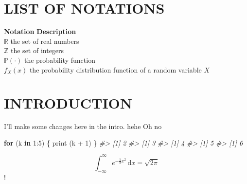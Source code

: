 \documentclass{source/tex/templates/maththesis}
\newenvironment{Shaded}{\begin{snugshade}}{\end{snugshade}}
\newcommand{\CommentTok}[1]{\textcolor[rgb]{0.56,0.35,0.01}{\textit{#1}}}
\newcommand{\ControlFlowTok}[1]{\textcolor[rgb]{0.13,0.29,0.53}{\textbf{#1}}}
\newcommand{\DecValTok}[1]{\textcolor[rgb]{0.00,0.00,0.81}{#1}}
\newcommand{\FunctionTok}[1]{\textcolor[rgb]{0.00,0.00,0.00}{#1}}
\newcommand{\NormalTok}[1]{#1}
\newcommand{\SpecialCharTok}[1]{\textcolor[rgb]{0.00,0.00,0.00}{#1}}
\begin{document}
\newpage
{}\setcounter{page}{1}

\hypertarget{list-of-notations}{%
\chapter*{LIST OF NOTATIONS}\label{list-of-notations}}

\begin{tabbing}

\hspace{0.25in} \={\bf Notation} \hspace{0.5in}\={\bf Description}\\ 
\>$\mathbb{R}$ \>the set of real numbers \\
\>$\mathbb{Z}$ \>the set of integers \\
\>$\mathbb{P}(\cdot)$ \>the probability function \\
\>$f_X(x)$ \>the probability distribution function of a random variable $X$ \\

\end{tabbing}

\listoffigures\newpage
{}

\listoftables\newpage
{}

\hypertarget{introduction}{%
\chapter{INTRODUCTION}\label{introduction}}

I'll make some changes here in the intro. hehe Oh no

\begin{Shaded}
\begin{Highlighting}[]
\ControlFlowTok{for}\NormalTok{ (k }\ControlFlowTok{in} \DecValTok{1}\SpecialCharTok{:}\DecValTok{5}\NormalTok{) \{}
  \FunctionTok{print}\NormalTok{ (k }\SpecialCharTok{+} \DecValTok{1}\NormalTok{)}
\NormalTok{\}}
\CommentTok{\#\textgreater{} [1] 2}
\CommentTok{\#\textgreater{} [1] 3}
\CommentTok{\#\textgreater{} [1] 4}
\CommentTok{\#\textgreater{} [1] 5}
\CommentTok{\#\textgreater{} [1] 6}
\end{Highlighting}
\end{Shaded}

\[
 \int_{-\infty}^{\infty} e^{-\frac{1}{2}x^2}\,\text{d}x = \sqrt{2\pi}
\]!
\end{document}
